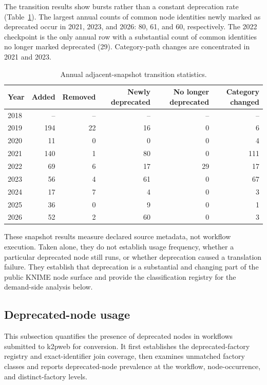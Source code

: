 \documentclass[runningheads]{llncs}
\begin{document}
The transition results show bursts rather than a constant deprecation rate
(Table~\ref{tab:annual-transitions}). The largest annual counts of common node
identities newly marked as deprecated occur in 2021, 2023, and 2026: 80, 61, and
60, respectively. The 2022 checkpoint is the only annual row with a substantial
count of common identities no longer marked deprecated (29). Category-path
changes are concentrated in 2021 and 2023.

\begin{table}
\centering
\caption{Annual adjacent-snapshot transition statistics.}
\label{tab:annual-transitions}
\scriptsize
\begin{tabular}{lrrrrr}
\toprule
Year & Added & Removed & Newly deprecated & No longer deprecated & Category changed \\
\midrule
2018 & -- & -- & -- & -- & -- \\
2019 & 194 & 22 & 16 & 0 & 6 \\
2020 & 11 & 0 & 0 & 0 & 4 \\
2021 & 140 & 1 & 80 & 0 & 111 \\
2022 & 69 & 6 & 17 & 29 & 17 \\
2023 & 56 & 4 & 61 & 0 & 67 \\
2024 & 17 & 7 & 4 & 0 & 3 \\
2025 & 36 & 0 & 9 & 0 & 1 \\
2026 & 52 & 2 & 60 & 0 & 3 \\
\bottomrule
\end{tabular}
\end{table}

These snapshot results measure declared source metadata, not workflow
execution. Taken alone, they do not establish usage frequency, whether a
particular deprecated node still runs, or whether deprecation caused a
translation failure. They establish that deprecation is a substantial and
changing part of the public KNIME node surface and provide the classification
registry for the demand-side analysis below.

\subsection{Deprecated-node usage}

This subsection quantifies the presence of deprecated nodes in workflows
submitted to k2pweb for conversion. It first establishes the deprecated-factory
registry and exact-identifier join coverage, then examines unmatched factory
classes and reports deprecated-node prevalence at the workflow, node-occurrence,
and distinct-factory levels.
\end{document}

